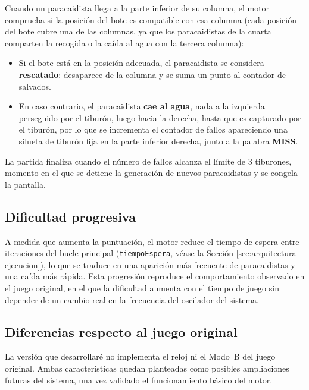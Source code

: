 Cuando un paracaidista llega a la parte inferior de su columna, el motor comprueba si la posición del bote es compatible con esa columna (cada posición del bote cubre una de las columnas, ya que los paracaidistas de la cuarta comparten la recogida o la caída al agua con la tercera columna):

\begin{itemize}
	\item Si el bote está en la posición adecuada, el paracaidista se considera \textbf{rescatado}: desaparece de la columna y se suma un punto al contador de salvados.
	\item En caso contrario, el paracaidista \textbf{cae al agua}, nada a la izquierda perseguido por el tiburón, luego hacia la derecha, hasta que es capturado por el tiburón, por lo que se incrementa el contador de fallos apareciendo una silueta de tiburón fija en la parte inferior derecha, junto a la palabra \textbf{MISS}.
\end{itemize}

La partida finaliza cuando el número de fallos alcanza el límite de 3 tiburones, momento en el que se detiene la generación de nuevos paracaidistas y se congela la pantalla.

\subsection{Dificultad progresiva}

A medida que aumenta la puntuación, el motor reduce el tiempo de espera entre iteraciones del bucle principal (\texttt{tiempoEspera}, véase la Sección \ref{sec:arquitectura-ejecucion}), lo que se traduce en una aparición más frecuente de paracaidistas y una caída más rápida. Esta progresión reproduce el comportamiento observado en el juego original, en el que la dificultad aumenta con el tiempo de juego sin depender de un cambio real en la frecuencia del oscilador del sistema.

\subsection{Diferencias respecto al juego original}

La versión que desarrollaré no implementa el reloj ni el Modo~B del juego original. Ambas características quedan planteadas como posibles ampliaciones futuras del sistema, una vez validado el funcionamiento básico del motor.

\clearpage

